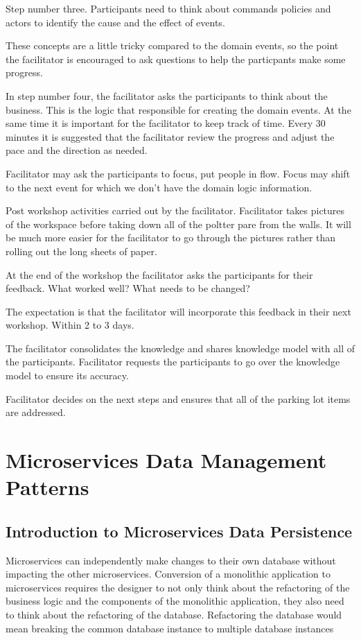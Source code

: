 Step number three.
Participants need to think about commands policies and actors to identify the cause and the effect of events.

These concepts are a little tricky compared to the domain events, so the point the facilitator is encouraged to ask questions to help the particpants make some progress.

In step number four, the facilitator asks the participants to think about the business.
This is the logic that responsible for creating the domain events.
At the same time it is important for the facilitator to keep track of time.
Every 30 minutes it is suggested that the facilitator review the progress and adjust the pace and the direction as needed.

Facilitator may ask the participants to focus, put people in flow.
Focus may shift to the next event for which we don't have the domain logic information.

Post workshop activities carried out by the facilitator.
Facilitator takes pictures of the workspace before taking down all of the poltter pare from the walls.
It will be much more easier for the facilitator to go through the pictures rather than rolling out the long sheets of paper.

At the end of the workshop the facilitator asks the participants for their feedback.
What worked well?
What needs to be changed?

The expectation is that the facilitator will incorporate this feedback in their next workshop.
Within 2 to 3 days.

The facilitator consolidates the knowledge and shares knowledge model with all of the participants.
Facilitator requests the participants to go over the knowledge model to ensure its accuracy.

Facilitator decides on the next steps and ensures that all of the parking lot items are addressed.


\chapter{Microservices Data Management Patterns}

\section{Introduction to Microservices Data Persistence}
Microservices can independently make changes to their own database without impacting the other microservices.
Conversion of a monolithic application to microservices requires the designer to not only think about the refactoring of the business logic and the components of the monolithic application,
they also need to think about the refactoring of the database.
Refactoring the database would mean breaking the common database instance to multiple database instances

